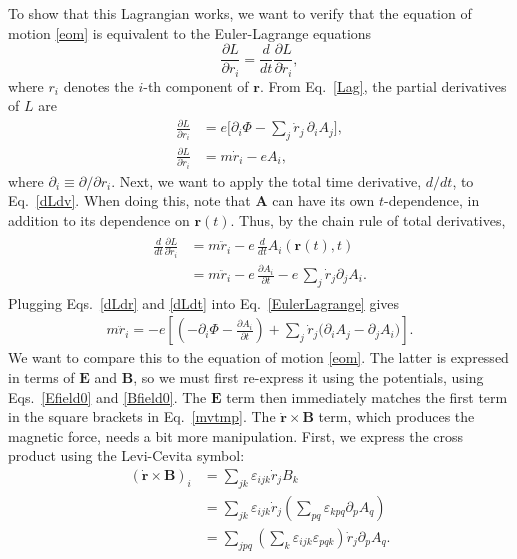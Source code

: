 \documentclass[prx,12pt]{revtex4-2}
\begin{document}
To show that this Lagrangian works, we want to verify that the
equation of motion \eqref{eom} is equivalent to the Euler-Lagrange
equations
\begin{equation}
  \frac{\partial L}{\partial r_i} = \frac{d}{dt}
  \frac{\partial L}{\partial \dot{r}_i},
  \label{EulerLagrange}
\end{equation}
where $r_i$ denotes the $i$-th component of $\mathbf{r}$.  From
Eq.~\eqref{Lag}, the partial derivatives of $L$ are
\begin{align}
  \frac{\partial L}{\partial r_i} &=
  e\Big[\partial_i \Phi - \sum_j \dot{r}_j \,\partial_i A_j \Big],\label{dLdr}\\
  \frac{\partial L}{\partial \dot{r}_i} &= m\dot{r}_i - e A_i,
  \label{dLdv}
\end{align}
where $\partial_i \equiv \partial/\partial r_i$.  Next, we want to
apply the total time derivative, $d/dt$, to Eq.~\eqref{dLdv}.  When
doing this, note that $\mathbf{A}$ can have its own $t$-dependence, in
addition to its dependence on $\mathbf{r}(t)$.  Thus, by the chain
rule of total derivatives,
\begin{align}
  \begin{aligned}
    \frac{d}{dt} \frac{\partial L}{\partial \dot{r}_i}
    &= m\ddot{r}_i - e\, \frac{d}{dt} A_i(\mathbf{r}(t),t) \\
    &= m\ddot{r}_i - e\, \frac{\partial A_i}{\partial t}
    - e\, \sum_j \dot{r}_j \partial_j A_i.
  \end{aligned}
  \label{dLdt}
\end{align}
Plugging Eqs.~\eqref{dLdr} and \eqref{dLdt} into
Eq.~\eqref{EulerLagrange} gives
\begin{align}
  m\ddot{r}_i =
  -e\left[\left(-\partial_i \Phi - \frac{\partial A_i}{\partial t}\right)
    + \sum_j \dot{r}_j \Big( \partial_i A_j - \partial_j A_i\Big) \right].
  \label{mvtmp}
\end{align}
We want to compare this to the equation of motion \eqref{eom}.  The
latter is expressed in terms of $\mathbf{E}$ and $\mathbf{B}$, so we
must first re-express it using the potentials, using
Eqs.~\eqref{Efield0} and \eqref{Bfield0}.  The $\mathbf{E}$ term then
immediately matches the first term in the square brackets in
Eq.~\eqref{mvtmp}.  The $\dot{\mathbf{r}}\times\mathbf{B}$ term, which
produces the magnetic force, needs a bit more manipulation.  First, we
express the cross product using the Levi-Cevita symbol:
\begin{align}
  (\dot{\mathbf{r}} \times \mathbf{B})_i &=
  \sum_{jk} \varepsilon_{ijk} \dot{r}_j B_k \\
  &= \sum_{jk} \varepsilon_{ijk} \dot{r}_j \left(\sum_{pq} \varepsilon_{kpq} \partial_p A_q  \right) \\
  &= \sum_{jpq} \left(\sum_k \varepsilon_{ijk} \varepsilon_{pqk}\right)
  \dot{r}_j  \partial_p A_q.
  \label{vBtmp}
\end{align}
\end{document}
